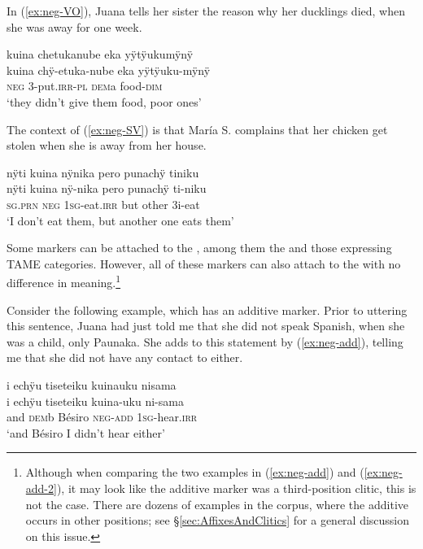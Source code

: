 In (\ref{ex:neg-VO}), Juana tells her sister the reason why her ducklings died, when she was away for one week. 

\ea\label{ex:neg-VO}
\begingl
\glpreamble kuina chetukanube eka yÿtÿukumÿnÿ \\
\gla kuina chÿ-etuka-nube eka yÿtÿuku-mÿnÿ \\
\glb \textsc{neg} 3-put.\textsc{irr}-\textsc{pl} \textsc{dem}a food-\textsc{dim}\\
\glft ‘they didn’t give them food, poor ones’
\endgl
{}
\xe
{}

The context of (\ref{ex:neg-SV}) is that María S. complains that her chicken get stolen when she is away from her house.

\ea\label{ex:neg-SV}
\begingl
\glpreamble nÿti kuina nÿnika pero punachÿ tiniku\\
\gla nÿti kuina nÿ-nika pero punachÿ ti-niku\\
\textsc{sg.prn} \textsc{neg} 1\textsc{sg}-eat.\textsc{irr} but other 3i-eat\\
\glft ‘I don’t eat them, but another one eats them’
\endgl
\trailingcitation{[rxx-e120511l.181]}
\xe

Some markers can be attached to the , among them the  and those expressing TAME categories. However, all of these markers can also attach to the  with no difference in meaning.\footnote{Although when comparing the two examples in (\ref{ex:neg-add}) and (\ref{ex:neg-add-2}), it may look like the additive marker was a third-position clitic, this is not the case. There are dozens of examples in the corpus, where the additive occurs in other positions; see §\ref{sec:AffixesAndClitics} for a general discussion on this issue.}

Consider the following example, which has an additive marker. Prior to uttering this sentence, Juana had just told me that she did not speak Spanish, when she was a child, only Paunaka. She adds to this statement by (\ref{ex:neg-add}), telling me that she did not have any contact to  either. 


\ea\label{ex:neg-add}
\begingl
\glpreamble i echÿu tiseteiku kuinauku nisama\\
\gla i echÿu tiseteiku kuina-uku ni-sama\\
\glb and \textsc{dem}b Bésiro \textsc{neg}-\textsc{add} 1\textsc{sg}-hear.\textsc{irr}\\
\glft ‘and Bésiro I didn’t hear either’
\endgl
\trailingcitation{[jxx-p120430l-1.028-030]}
\xe

